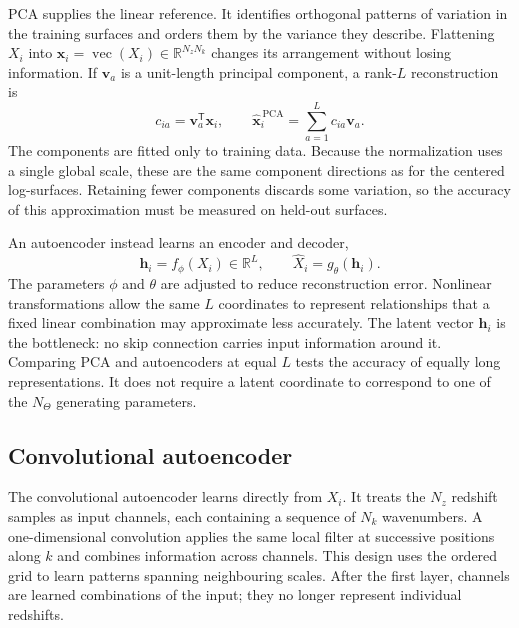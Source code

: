 PCA supplies the linear reference. It identifies orthogonal patterns of
variation in the training surfaces and orders them by the variance they
describe. Flattening $X_i$ into
$\bm{x}_i=\operatorname{vec}(X_i)\in\mathbb R^{N_zN_k}$
changes its arrangement without losing information. If $\bm v_a$ is a
unit-length principal component, a rank-$L$ reconstruction is
\begin{equation}
  c_{ia}=\bm v_a^{\mathsf T}\bm x_i,
  \qquad
  \widehat{\bm x}_i^{\,\mathrm{PCA}}
  =\sum_{a=1}^{L}c_{ia}\bm v_a.
  \label{eq:pca-reconstruction}
\end{equation}
The components are fitted only to training data. Because the normalization
uses a single global scale, these are the same component directions as for
the centered log-surfaces. Retaining fewer components discards some
variation, so the accuracy of this approximation must be measured on
held-out surfaces.

An autoencoder instead learns an encoder and decoder,
\begin{equation}
  \bm h_i=f_\phi(X_i)\in\mathbb R^L,
  \qquad
  \widehat X_i=g_\theta(\bm h_i).
  \label{eq:encoder-decoder}
\end{equation}
The parameters $\phi$ and $\theta$ are adjusted to reduce reconstruction
error. Nonlinear transformations allow the same $L$ coordinates to
represent relationships that a fixed linear combination may approximate
less accurately. The latent vector $\bm h_i$ is the bottleneck: no skip
connection carries input information around it. Comparing PCA and
autoencoders at equal $L$ tests the accuracy of equally long
representations. It does not require a latent coordinate to correspond to
one of the $N_\Theta$ generating parameters.

\subsection{Convolutional autoencoder}
\label{sec:conv1d-autoencoder}

The convolutional autoencoder learns directly from $X_i$. It treats the
$N_z$ redshift samples as input channels, each containing a sequence of
$N_k$ wavenumbers. A one-dimensional convolution applies the same local
filter at successive positions along $k$ and combines information across
channels. This design uses the ordered grid to learn patterns spanning
neighbouring scales. After the first layer, channels are learned
combinations of the input; they no longer represent individual redshifts.

